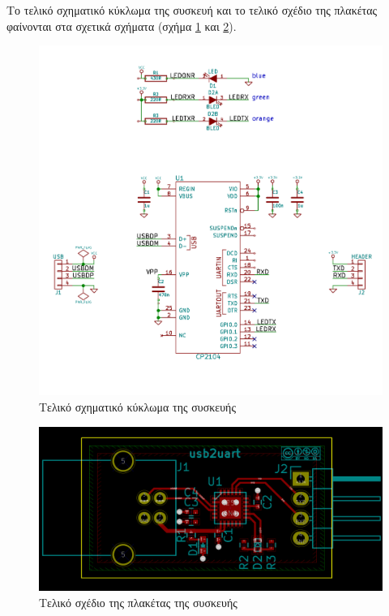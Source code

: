 \documentclass[a4paper]{article}
\begin{document}
Το τελικό σχηματικό κύκλωμα της συσκευή και το τελικό σχέδιο της πλακέτας φαίνονται στα σχετικά σχήματα (σχήμα \ref{fig:eesch-schem-final} και \ref{fig:pcb-layout-final}).

\begin{figure}
  \begin{center}
    \includegraphics[width=.9\textwidth]{img/eesch-schem-final.png}
    \caption{Τελικό σχηματικό κύκλωμα της συσκευής}
    \label{fig:eesch-schem-final}
  \end{center}
\end{figure}

\begin{figure}
  \begin{center}
    \includegraphics[width=.9\textwidth]{img/pcb-layout-final.png}
    \caption{Τελικό σχέδιο της πλακέτας της συσκευής}
    \label{fig:pcb-layout-final}
  \end{center}
\end{figure}
\end{document}
